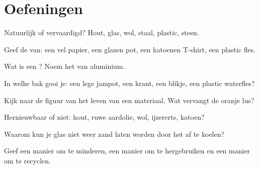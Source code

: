 \section{Oefeningen}

\begin{exercise}[$\star$]\label{exo:g5:raw-materials-and-recycling:1}
Natuurlijk of vervaardigd? Hout, glas, wol, staal, plastic, steen.
\end{exercise}

\begin{exercise}[$\star$]\label{exo:g5:raw-materials-and-recycling:2}
Geef de  van: een vel papier, een glazen pot, een katoenen
T-shirt, een plastic fles.
\end{exercise}

\begin{exercise}[$\star$]\label{exo:g5:raw-materials-and-recycling:3}
Wat is een ? Noem het  van aluminium.
\end{exercise}

\begin{exercise}[$\star$]\label{exo:g5:raw-materials-and-recycling:4}
In welke bak gooi je: een lege jampot, een krant, een blikje, een
plastic waterfles?
\end{exercise}

\begin{exercise}[$\star$]\label{exo:g5:raw-materials-and-recycling:5}
Kijk naar de figuur van het leven van een materiaal. Wat vervangt de
oranje lus?
\end{exercise}

\begin{exercise}[$\star$]\label{exo:g5:raw-materials-and-recycling:6}
Hernieuwbaar of niet: hout, ruwe aardolie, wol, ijzererts, katoen?
\end{exercise}

\begin{exercise}[$\star$]\label{exo:g5:raw-materials-and-recycling:7}
Waarom kun je glas niet weer zand laten worden door het af te koelen?
\end{exercise}

\begin{exercise}[$\star$]\label{exo:g5:raw-materials-and-recycling:8}
Geef een manier om te minderen, een manier om te hergebruiken en een
manier om te recyclen.
\end{exercise}

